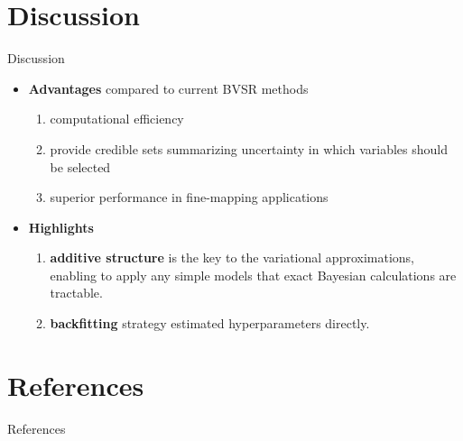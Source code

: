 \documentclass[10pt]{beamer}
\begin{document}
\section{Discussion}

\begin{frame}{Discussion}
    \begin{itemize}
        \item \textbf{Advantages} compared to current BVSR methods
        \begin{enumerate}
            \item computational efficiency
            \item provide credible sets summarizing uncertainty in which variables should be selected
            \item superior performance in fine-mapping applications
        \end{enumerate}

        \bigskip

        \item \textbf{Highlights}
        \begin{enumerate}
            \item \textbf{additive structure} is the key to the variational approximations, enabling to apply any simple models that exact Bayesian calculations are tractable.
            \item \textbf{backfitting} strategy estimated hyperparameters directly.
        \end{enumerate}
        
    \end{itemize}
\end{frame}




\section{References}
\begin{frame}{References}
    \footnotesize
    \nocite{}
    
    
\end{frame}








\end{document}
